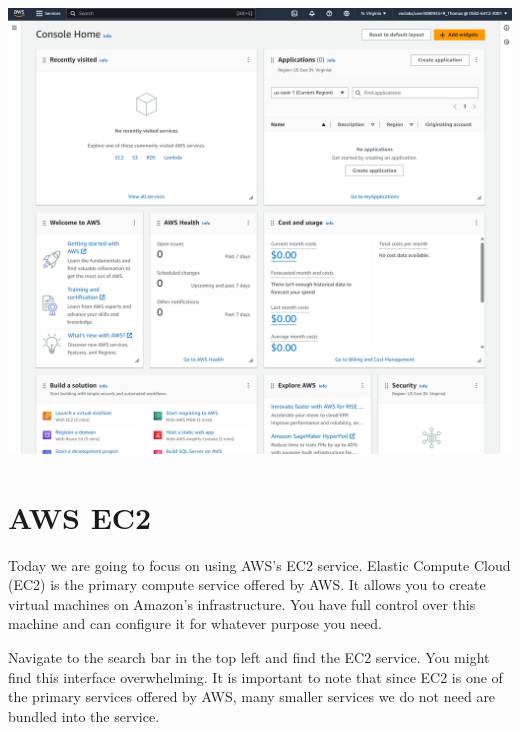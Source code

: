 \documentclass{csse4400}
\begin{document}
\begin{enumerate}

\hspace{-6mm}
\includegraphics[width=\textwidth]{images/aws-console}

\end{enumerate}

\vspace{3mm}

\section{AWS EC2}

Today we are going to focus on using AWS's EC2 service.
Elastic Compute Cloud (EC2) is the primary compute service offered by AWS.
It allows you to create virtual machines on Amazon's infrastructure.
You have full control over this machine and can configure it for whatever purpose you need.

Navigate to the search bar in the top left and find the EC2 service.
You might find this interface overwhelming.
It is important to note that since EC2 is one of the primary services offered by AWS,
many smaller services we do not need are bundled into the service.
\end{document}
